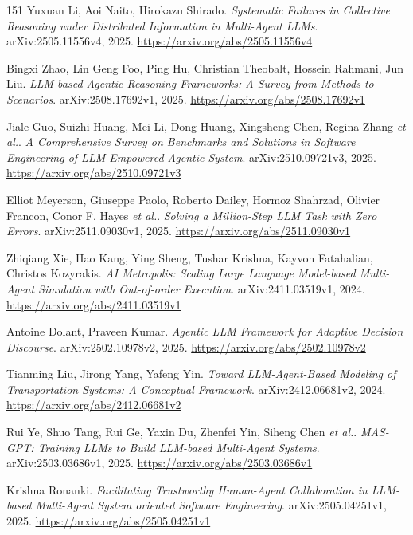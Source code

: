 \documentclass[11pt,a4paper]{article}
\begin{document}
\begin{thebibliography}{151}
Yuxuan Li, Aoi Naito, Hirokazu Shirado.
\newblock \emph{Systematic Failures in Collective Reasoning under Distributed Information in Multi-Agent LLMs}.
\newblock arXiv:2505.11556v4, 2025.
\newblock \url{https://arxiv.org/abs/2505.11556v4}

Bingxi Zhao, Lin Geng Foo, Ping Hu, Christian Theobalt, Hossein Rahmani, Jun Liu.
\newblock \emph{LLM-based Agentic Reasoning Frameworks: A Survey from Methods to Scenarios}.
\newblock arXiv:2508.17692v1, 2025.
\newblock \url{https://arxiv.org/abs/2508.17692v1}

Jiale Guo, Suizhi Huang, Mei Li, Dong Huang, Xingsheng Chen, Regina Zhang \emph{et al.}.
\newblock \emph{A Comprehensive Survey on Benchmarks and Solutions in Software Engineering of LLM-Empowered Agentic System}.
\newblock arXiv:2510.09721v3, 2025.
\newblock \url{https://arxiv.org/abs/2510.09721v3}

Elliot Meyerson, Giuseppe Paolo, Roberto Dailey, Hormoz Shahrzad, Olivier Francon, Conor F. Hayes \emph{et al.}.
\newblock \emph{Solving a Million-Step LLM Task with Zero Errors}.
\newblock arXiv:2511.09030v1, 2025.
\newblock \url{https://arxiv.org/abs/2511.09030v1}

Zhiqiang Xie, Hao Kang, Ying Sheng, Tushar Krishna, Kayvon Fatahalian, Christos Kozyrakis.
\newblock \emph{AI Metropolis: Scaling Large Language Model-based Multi-Agent Simulation with Out-of-order Execution}.
\newblock arXiv:2411.03519v1, 2024.
\newblock \url{https://arxiv.org/abs/2411.03519v1}

Antoine Dolant, Praveen Kumar.
\newblock \emph{Agentic LLM Framework for Adaptive Decision Discourse}.
\newblock arXiv:2502.10978v2, 2025.
\newblock \url{https://arxiv.org/abs/2502.10978v2}

Tianming Liu, Jirong Yang, Yafeng Yin.
\newblock \emph{Toward LLM-Agent-Based Modeling of Transportation Systems: A Conceptual Framework}.
\newblock arXiv:2412.06681v2, 2024.
\newblock \url{https://arxiv.org/abs/2412.06681v2}

Rui Ye, Shuo Tang, Rui Ge, Yaxin Du, Zhenfei Yin, Siheng Chen \emph{et al.}.
\newblock \emph{MAS-GPT: Training LLMs to Build LLM-based Multi-Agent Systems}.
\newblock arXiv:2503.03686v1, 2025.
\newblock \url{https://arxiv.org/abs/2503.03686v1}

Krishna Ronanki.
\newblock \emph{Facilitating Trustworthy Human-Agent Collaboration in LLM-based Multi-Agent System oriented Software Engineering}.
\newblock arXiv:2505.04251v1, 2025.
\newblock \url{https://arxiv.org/abs/2505.04251v1}


\end{thebibliography}
\end{document}
